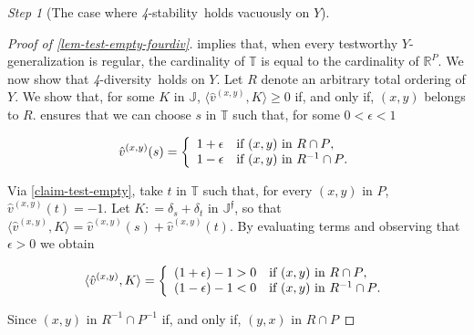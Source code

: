 \documentclass[ecta,nameyear,draft]{econsocart}
\newcommand{\R}{\mathbb R}
\newcommand{\novel}{\mathfrak f}
\newcommand{\mbbt}{{\mathds {T}}}
\newcommand{\mbbj}{\mathds J}
\newcommand{\mbbjp}{{\mathds {J}^{\novel}}}
\newcommand{\xy}{{(x, y)}}
\newcommand{\yx}{{(y, x)}}
\newcommand{\stability}{\textit{4}-\textup{{stability}}}
\newcommand{\fourdiv}{\textit{4}-\textup{diversity}}
\theoremstyle{plain}
\theoremstyle{remark}
\newtheorem{step}{Step}[section]
\begin{document}
\begin{appendix}
\begin{step}[The case where \stability\ holds vacuously on $Y$]
\begin{proof}[Proof of \cref{lem-test-empty-fourdiv}]
       implies that, when every testworthy
      $Y$-generalization is regular, the cardinality of $\mbbt$ is equal to the
      cardinality of $\R^{P}$.  We now show that \fourdiv\ holds on $Y$. Let
      ${R}$ denote an arbitrary total ordering of $Y$.  We show that, for some
      $K$ in $\mbbj$, $\langle \hat{v}^{\xy}, K \rangle \geq 0$ if, and only if,
      $\xy$ belongs to ${R}$.  ensures that we can choose
      $s$ in $\mbbt$ such that, for some $0 < \epsilon <1$
      \begin{linenomath*}
        \begin{equation*}
          \hat{v}^{\xy} ( s ) = \left \{
            \begin{array}{l l}
              1+ \epsilon & \text{if $\xy$ in ${R} \cap P $},\\
              1-\epsilon & \text{if $\xy$ in ${R}^{- 1} \cap P $}.
            \end{array}
          \right.
        \end{equation*}
      \end{linenomath*}
      Via \cref{claim-test-empty}, take $t$ in $\mbbt$ such that, for every $\xy$
      in $P$, $\hat{v}^{\xy} ( t ) = -1$.  Let $K : = \delta _{s} + \delta _{t }$
      in $\mbbjp$, so that $\langle \hat{v}^{\xy}, K \rangle = \hat{v}^{\xy}(s) +
      \hat{v}^{\xy}(t)$. By evaluating terms and observing that $\epsilon > 0$ we
      obtain
      \begin{linenomath*} 
        \begin{equation*}
          \langle \hat{v}^{\xy}, K \rangle = \left \{
            \begin{array}{l l}
              (1+ \epsilon) - 1 > 0 & \text{if $\xy$ in ${R} \cap P $},\\
              (1- \epsilon) - 1 < 0 & \text{if $\xy$ in ${R}^{-1}\cap P$}.
            \end{array}
          \right.
        \end{equation*}
      \end{linenomath*} 
      Since $\xy$ in ${R}^{-1} \cap P^{-1}$ if, and only if, $\yx$ in ${R}\cap P$

\end{proof}
\end{step}
\end{appendix}
\end{document}

